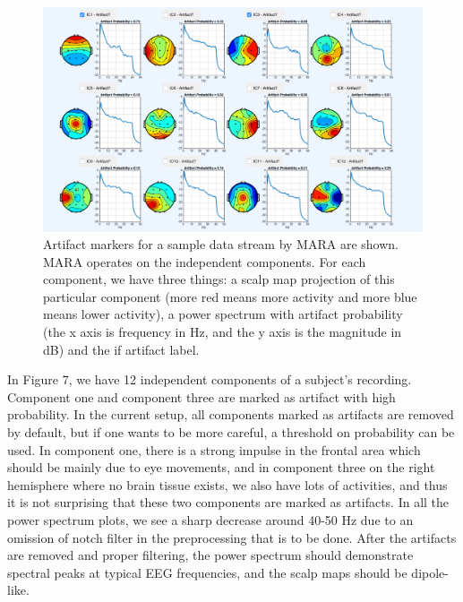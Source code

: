 \documentclass[a4paper,11pt,oneside]{article}
\begin{document}
	\begin{figure}[!h]
	\begin{center}
		\includegraphics[width=\textwidth]{img/ica}
	\end{center}
	\caption{Artifact markers for a sample data stream by MARA are shown. MARA operates on the independent components. For each component, we have three things: a scalp map projection of this particular component (more red means more activity and more blue means lower activity), a power spectrum with artifact probability (the x axis is frequency in Hz, and the y axis is the magnitude in dB) and the if artifact label. }
\end{figure}
	In Figure 7, we have 12 independent components of a subject's recording. Component one and component three are marked as artifact with high probability. In the current setup, all components marked as artifacts are removed by default, but if one wants to be more careful, a threshold on probability can be used. In component one, there is a strong impulse in the frontal area which should be mainly due to eye movements, and in component three on the right hemisphere where no brain tissue exists, we also have lots of activities, and thus it is not surprising that these two components are marked as artifacts. In all the power spectrum plots, we see a sharp decrease around 40-50 Hz due to an omission of notch filter in the preprocessing that is to be done. After the artifacts are removed and proper filtering, the power spectrum should demonstrate spectral peaks at typical EEG frequencies, and the scalp maps should be dipole-like.  
\end{document}
